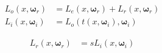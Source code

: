 \documentclass[uplatex,dvipdfmx,a4paper,11pt]{jlreq}
\newcommand{\omg}{\bm{\omega}}
\theoremstyle{definition}
\begin{document}
\begin{definition}[レンダリング方程式]
  \begin{align}
    L_o(x, \omg_r) & = L_e(x, \omg_r) + L_r(x, \omg_r) \\
    L_i(x, \omg_i) & = L_o(t(x, \omg_i), \omg_i)
  \end{align}
\end{definition}


\begin{proposition}
  \begin{align}
    L_r(x, \omg_r) & = sL_i(x, \omg_i)
  \end{align}
\end{proposition}

\begin{definition}

\end{definition}
\end{document}
